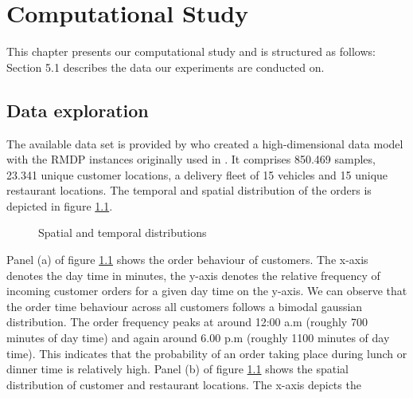 \chapter{Computational Study}

This chapter presents our computational study and is structured as follows: Section 5.1 describes the data our experiments are conducted on.  
\section{Data exploration}

The available data set is provided by \cite{Hildebrandt2020_EAT} who created a high-dimensional data model with the RMDP instances originally used in \cite{UlmerRMDP}. It comprises 850.469 samples, 23.341 unique customer locations, a delivery fleet of 15 vehicles and 15 unique restaurant locations. The temporal and spatial distribution of the orders is depicted in figure \ref{fig:dists}. 
\begin{figure}[h]
	\centering
	\caption{Spatial and temporal distributions}
	\label{fig:dists}
\end{figure}

Panel (a) of figure \ref{fig:dists} shows the order behaviour of customers. The x-axis denotes the day time in minutes, the y-axis denotes the relative frequency of incoming customer orders for a given day time on the y-axis. We can observe that the order time behaviour across all customers follows a bimodal gaussian distribution. The order frequency peaks at around 12:00 a.m (roughly 700 minutes of day time) and again around 6.00 p.m (roughly 1100 minutes of day time). This indicates that the probability of an order taking place during lunch or dinner time is relatively high.  
Panel (b) of figure \ref{fig:dists} shows the spatial distribution of customer and restaurant locations. The x-axis depicts the 

